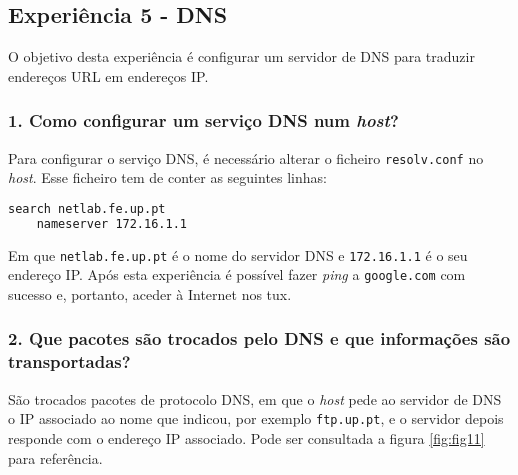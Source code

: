 \subsection*{Experiência 5 - DNS}
O objetivo desta experiência é configurar um servidor de DNS para traduzir endereços URL em endereços IP.

\subsubsection{1. Como configurar um serviço DNS num \emph{host}?}
Para configurar o serviço DNS, é necessário alterar o ficheiro \verb+resolv.conf+ no \emph{host}. Esse ficheiro tem de conter as seguintes linhas:
\begin{lstlisting}[language=bash]
	search netlab.fe.up.pt
	nameserver 172.16.1.1
\end{lstlisting}

Em que \verb+netlab.fe.up.pt+ é o nome do servidor DNS e \verb+172.16.1.1+ é o seu endereço IP. Após esta experiência é possível fazer \emph{ping} a \verb+google.com+ com sucesso e, portanto, aceder à Internet nos tux.

\subsubsection{2. Que pacotes são trocados pelo DNS e que informações são transportadas?}
São trocados pacotes de protocolo DNS, em que o \emph{host} pede ao servidor de DNS o IP associado ao nome que indicou, por exemplo \verb+ftp.up.pt+, e o servidor depois responde com o endereço IP associado. Pode ser consultada a figura \ref{fig:fig11} para referência. 
